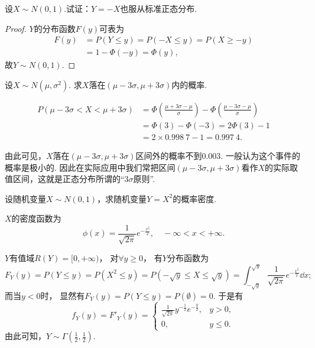 \begin{example}
设\(X \sim N(0,1)\).试证：\(Y=-X\)也服从标准正态分布.
\begin{proof}
\(Y\)的分布函数\(F(y)\)可表为
\begin{align*}
	F(y) &= P(Y \leq y) = P(-X \leq y) = P(X \geq -y) \\
	&= 1 - \Phi(-y) = \Phi(y),
\end{align*}
故\(Y \sim N(0,1)\).
\end{proof}
\end{example}

\begin{example}
设\(X \sim N(\mu,\sigma^2)\).
求\(X\)落在\((\mu-3\sigma,\mu+3\sigma)\)内的概率.
\begin{solution}
\begin{align*}
	P(\mu-3\sigma<X<\mu+3\sigma)
	&= \Phi\left(\frac{\mu+3\sigma-\mu}{\sigma}\right)
	- \Phi\left(\frac{\mu-3\sigma-\mu}{\sigma}\right) \\
	&= \Phi(3) - \Phi(-3) = 2\Phi(3) - 1 \\
	&= 2 \times 0.998\ 7 - 1 = 0.997\ 4.
\end{align*}
\end{solution}
\end{example}
由此可见，\(X\)落在\((\mu-3\sigma,\mu+3\sigma)\)区间外的概率不到\(0.003\).
一般认为这个事件的概率是极小的.
因此在实际应用中我们常把区间\((\mu-3\sigma,\mu+3\sigma)\)看作\(X\)的实际取值区间，这就是正态分布所谓的“\(3\sigma\)原则”.

\begin{example}
设随机变量\(X \sim N(0,1)\)，求随机变量\(Y = X^2\)的概率密度.
\begin{solution}
\(X\)的密度函数为\[
	\phi(x) = \frac{1}{\sqrt{2\pi}} e^{-\frac{x^2}{2}},
	\quad -\infty < x < +\infty.
\]

\(Y\)有值域\(R(Y) = [0,+\infty)\)，
对\(\forall y \geq 0\)，
有\(Y\)分布函数为\[
	F_Y(y) = P(Y \leq y) = P(X^2 \leq y)
	= P(-\sqrt{y} \leq X \leq \sqrt{y})
	= \int_{-\sqrt{y}}^{\sqrt{y}}{\frac{1}{\sqrt{2\pi}} e^{-\frac{x^2}{2}} \dd{x}};
\]
而当\(y < 0\)时，
显然有\(F_Y(y) = P(Y \leq y) = P(\emptyset) = 0\).
于是有\[
f_Y(y) = F'_Y(y) = \left\{ \begin{array}{ll}
\frac{1}{\sqrt{2\pi}} y^{-\frac{1}{2}} e^{-\frac{y}{2}}, & y > 0, \\
0, & y \leq 0.
\end{array} \right.
\]
由此可知，\(Y \sim \Gamma\left(\frac{1}{2},\frac{1}{2}\right)\).
\end{solution}
\end{example}
